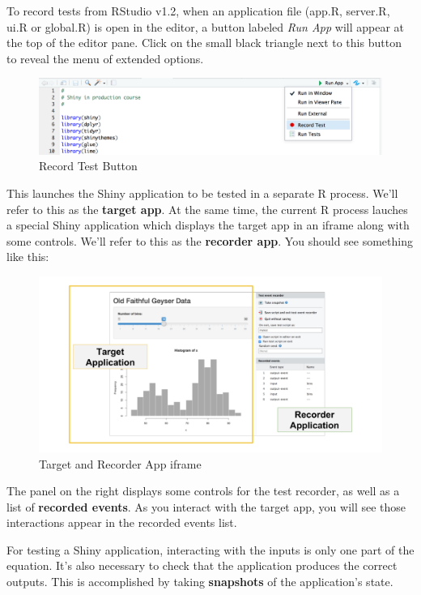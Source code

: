 \documentclass[]{book}
\theoremstyle{definition}
\theoremstyle{definition}
\theoremstyle{definition}
\theoremstyle{remark}
\begin{document}
To record tests from RStudio v1.2, when an application file (app.R,
server.R, ui.R or global.R) is open in the editor, a button labeled
\emph{Run App} will appear at the top of the editor pane. Click on the
small black triangle next to this button to reveal the menu of extended
options.

\begin{figure}
\centering
\includegraphics{imgs/testing/record_test_button.png}
\caption{Record Test Button}
\end{figure}

This launches the Shiny application to be tested in a separate R
process. We'll refer to this as the \textbf{target app}. At the same
time, the current R process lauches a special Shiny application which
displays the target app in an iframe along with some controls. We'll
refer to this as the \textbf{recorder app}. You should see something
like this:

\begin{figure}
\centering
\includegraphics{imgs/testing/recorder_and_target.png}
\caption{Target and Recorder App iframe}
\end{figure}

The panel on the right displays some controls for the test recorder, as
well as a list of \textbf{recorded events}. As you interact with the
target app, you will see those interactions appear in the recorded
events list.

For testing a Shiny application, interacting with the inputs is only one
part of the equation. It's also necessary to check that the application
produces the correct outputs. This is accomplished by taking
\textbf{snapshots} of the application's state.
\end{document}
